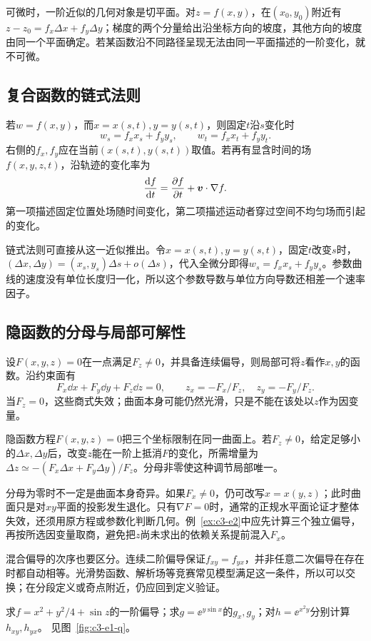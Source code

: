 可微时，一阶近似的几何对象是切平面。对$z=f(x,y)$，在$(x_0,y_0)$附近有$z-z_0=f_x\Delta x+f_y\Delta y$；梯度的两个分量给出沿坐标方向的坡度，其他方向的坡度由同一个平面确定。若某函数沿不同路径呈现无法由同一平面描述的一阶变化，就不可微。

\subsection{复合函数的链式法则}
若$w=f(x,y)$，而$x=x(s,t),y=y(s,t)$，则固定$t$沿$s$变化时
\[w_s=f_xx_s+f_yy_s,\qquad w_t=f_xx_t+f_yy_t.\]
右侧的$f_x,f_y$应在当前$(x(s,t),y(s,t))$取值。若再有显含时间的场$f(x,y,z,t)$，沿轨迹的变化率为
\[\frac{\mathop{}\!\mathrm d f}{\mathop{}\!\mathrm d t}=\frac{\partial f}{\partial t}+\bm{v}\cdot\nabla f.\]
第一项描述固定位置处场随时间变化，第二项描述运动者穿过空间不均匀场而引起的变化。

链式法则可直接从这一近似推出。令$x=x(s,t),y=y(s,t)$，固定$t$改变$s$时，$(\Delta x,\Delta y)=(x_s,y_s)\Delta s+o(\Delta s)$，代入全微分即得$w_s=f_xx_s+f_yy_s$。参数曲线的速度没有单位长度归一化，所以这个参数导数与单位方向导数还相差一个速率因子。

\subsection{隐函数的分母与局部可解性}
设$F(x,y,z)=0$在一点满足$F_z\ne0$，并具备连续偏导，则局部可将$z$看作$x,y$的函数。沿约束面有
\[F_x\dd x+F_y\dd y+F_z\dd z=0,\qquad
z_x=-F_x/F_z,\quad z_y=-F_y/F_z.
\]
当$F_z=0$，这些商式失效；曲面本身可能仍然光滑，只是不能在该处以$z$作为因变量。

隐函数方程$F(x,y,z)=0$把三个坐标限制在同一曲面上。若$F_z\ne0$，给定足够小的$\Delta x,\Delta y$后，改变$z$能在一阶上抵消$F$的变化，所需增量为$\Delta z\simeq-(F_x\Delta x+F_y\Delta y)/F_z$。分母非零使这种调节局部唯一。

分母为零时不一定是曲面本身奇异。如果$F_x\ne0$，仍可改写$x=x(y,z)$；此时曲面只是对$xy$平面的投影发生退化。只有$\nabla F=0$时，通常的正规水平面论证才整体失效，还须用原方程或参数化判断几何。例~\ref{ex:c3-e2}中应先计算三个独立偏导，再按所选因变量取商，避免把$z$尚未求出的依赖关系提前混入$F_x$。

混合偏导的次序也要区分。连续二阶偏导保证$f_{xy}=f_{yx}$，并非任意二次偏导在存在时都自动相等。光滑势函数、解析场等竞赛常见模型满足这一条件，所以可以交换；在分段定义或奇点附近，仍应回到定义验证。

\begin{example}[偏导数与混合偏导]\label{ex:c3-e1}
求$f=x^2+y^2/4+\sin z$的一阶偏导；求$g=\ee^{y\sin x}$的$g_x,g_y$；对$h=\ee^{x^2y}$分别计算$h_{xy},h_{yx}$。 见图~\ref{fig:c3-e1-q}。
\end{example}


